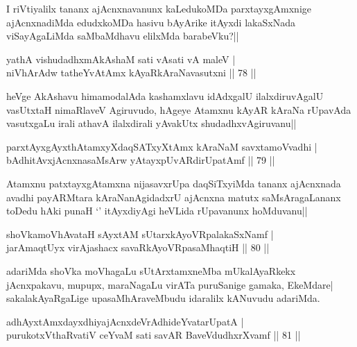\begin{artha}
I riVtiyalilx tananx ajAcnxnavanunx kaLedukoMDa parxtayxgAmxnige ajAcnxnadiMda edudxkoMDa hasivu bAyArike itAyxdi lakaSxNada viSayAgaLiMda saMbaMdhavu elilxMda barabeVku?||
\end{artha}


\begin{shl}
yathA vishudadhxmAkAshaM sati vA\s sati vA maleV |\\
niVhArAdw tatheYvA\s \s tAmx kAyaRkAraNavasutxni \hfill || 78 ||
\end{shl}

\begin{artha}
heVge AkAshavu himamodalAda kashamxlavu idAdxgalU ilalxdiruvAgalU vasUtxtaH nimaRlaveV Agiruvudo, hAgeye Atamxnu kAyAR kAraNa rUpavAda vasutxgaLu irali athavA ilalxdirali yAvakUtx shudadhxvAgiruvanu||
\end{artha}

\begin{shl}
parxtAyxgAyxthAtamxyXdaqSATxyX\s \s tAmx kAraNaM savxtamoVvadhi |\\
bAdhitAvx\s jAcnxnasaMsArw yAtayxpUvARdirUpatAmf \hfill || 79 ||
\end{shl}

\begin{artha}
Atamxnu patxtayxgAtamxna nijasavxrUpa daqSiTxyiMda tananx ajAcnxnada avadhi payARMtara kAraNanAgidadxrU ajAcnxna matutx saMsAragaLananx toDedu hAki punaH `\stext' itAyxdiyAgi heVLida rUpavanunx hoMduvanu||
\end{artha}


\begin{shl}
shoVkamoVhAvataH sAyxtAM sUtarxkAyoVRpalakaSxNamf |\\
jarAmaqtUyx virAjashacx savaRkAyoVRpasaMhaqtiH \hfill || 80 ||
\end{shl}

\begin{artha}
adariMda shoVka moVhagaLu sUtArxtamxneMba mUkalAyaRkekx jAcnxpakavu, mupupx, maraNagaLu virATa puruSanige gamaka, EkeMdare| sakalakAyaRgaLige upasaMhAraveMbudu idaralilx kANuvudu adariMda.
\end{artha}

\begin{shl}
adhAyxtAmxdayxdhiyajAcnxdeVrAdhideYvatarUpatA |\\
purukotxV\s thaRvatiV ceYvaM sati savAR BaveVdudhxrXvamf \hfill || 81 ||
\end{shl}

